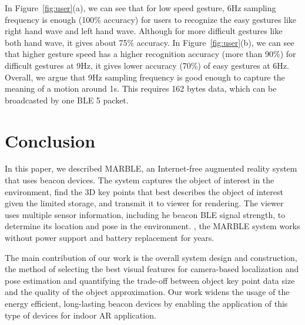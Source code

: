 In Figure~\ref{fig:user}(a), we can see that for low speed gesture, 6Hz sampling frequency is enough (100\% accuracy) for users to recognize the easy gestures like right hand wave and left hand wave. Although for more difficult gestures like both hand wave, it gives about 75\% accuracy. In Figure~\ref{fig:user}(b), we can see that higher gesture speed has a higher recognition accuracy (more than 90\%) for difficult gestures at 9Hz, it gives lower accuracy (70\%) of easy gestures at 6Hz. Overall, we argue that 9Hz sampling frequency is good enough to capture the meaning of a motion around 1s. This requires 162 bytes data, which can be broadcasted by one BLE 5 packet.

\section{Conclusion}
\label{sec:conclusion}
In this paper, we described MARBLE, an Internet-free augmented reality system that uses beacon devices. The system captures the object of interest in the environment, find the 3D key points that best describes the object of interest given the limited storage, and transmit it to viewer for rendering. The viewer uses multiple sensor information, including he beacon BLE signal strength, to determine its location and pose in the environment. , the MARBLE system works without  power support and battery replacement for years.

The main contribution of our work is the overall system design and construction, the method of selecting the best visual features for camera-based localization and pose estimation and quantifying the trade-off between object key point data size and the quality of the object approximation. Our work widens the usage of the energy efficient, long-lasting beacon devices by enabling the application of this type of devices for indoor AR application. 



